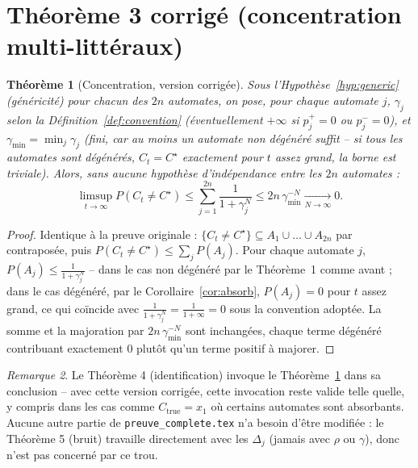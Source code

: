 \documentclass[11pt]{article}
\newtheorem{theorem}{Théorème}
\theoremstyle{remark}
\newtheorem{remark}[theorem]{Remarque}
\begin{document}
\section{Théorème 3 corrigé (concentration multi-littéraux)}

\begin{theorem}[Concentration, version corrigée]\label{thm:multi}
Sous l'Hypothèse~\ref{hyp:generic} (généricité) pour chacun des $2n$
automates, on pose, pour chaque automate $j$, $\gamma_j$ selon la
Définition~\ref{def:convention} (éventuellement $+\infty$ si $p_j^+=0$ ou
$p_j^-=0$), et $\gamma_{\min}=\min_j\gamma_j$ (fini, car au moins un automate
non dégénéré suffit -- si tous les automates sont dégénérés, $C_t=C^\star$
exactement pour $t$ assez grand, la borne est triviale). Alors, sans aucune
hypothèse d'indépendance entre les $2n$ automates :
$$\limsup_{t\to\infty}P(C_t\ne C^\star)\le\sum_{j=1}^{2n}\frac1{1+\gamma_j^N}\le2n\,\gamma_{\min}^{-N}\xrightarrow[N\to\infty]{}0.$$
\end{theorem}

\begin{proof}
Identique à la preuve originale : $\{C_t\ne C^\star\}\subseteq A_1\cup\dots\cup A_{2n}$
par contraposée, puis $P(C_t\ne C^\star)\le\sum_jP(A_j)$. Pour chaque
automate $j$, $P(A_j)\le\frac1{1+\gamma_j^N}$ -- dans le cas non dégénéré
par le Théorème~1 comme avant ; dans le cas dégénéré, par le
Corollaire~\ref{cor:absorb}, $P(A_j)=0$ pour $t$ assez grand, ce qui
coïncide avec $\frac1{1+\gamma_j^N}=\frac1{1+\infty}=0$ sous la convention
adoptée. La somme et la majoration par $2n\,\gamma_{\min}^{-N}$ sont
inchangées, chaque terme dégénéré contribuant exactement $0$ plutôt qu'un
terme positif à majorer.
\end{proof}

\begin{remark}
Le Théorème 4 (identification) invoque le Théorème~\ref{thm:multi} dans sa
conclusion -- avec cette version corrigée, cette invocation reste valide
telle quelle, y compris dans les cas comme $C_{\mathrm{true}}=x_1$ où
certains automates sont absorbants. Aucune autre partie de
\texttt{preuve\_complete.tex} n'a besoin d'être modifiée : le Théorème 5
(bruit) travaille directement avec les $\Delta_j$ (jamais avec $\rho$ ou
$\gamma$), donc n'est pas concerné par ce trou.
\end{remark}
\end{document}
